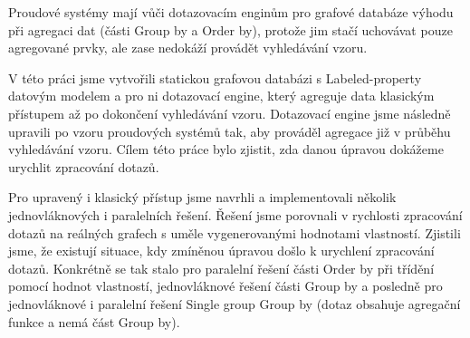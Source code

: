 \documentclass[12pt]{report}
\begin{document}
Proudové systémy mají vůči dotazovacím enginům pro grafové databáze výhodu při agregaci dat (části Group by a Order by), protože jim stačí uchovávat pouze agregované prvky, ale zase nedokáží provádět vyhledávání vzoru.

V této práci jsme vytvořili statickou grafovou databázi s Labeled-property datovým modelem a pro ni dotazovací engine, který agreguje data klasickým přístupem až po dokončení vyhledávání vzoru.
Dotazovací engine jsme následně upravili po vzoru proudových systémů tak, aby prováděl agregace již v průběhu vyhledávání vzoru.
Cílem této práce bylo zjistit, zda danou úpravou dokážeme urychlit zpracování dotazů.

Pro upravený i klasický přístup jsme navrhli a implementovali několik jednovláknových i paralelních řešení.
Řešení jsme porovnali v rychlosti zpracování dotazů na reálných grafech s uměle vygenerovanými hodnotami vlastností.
Zjistili jsme, že existují situace, kdy zmíněnou úpravou došlo k urychlení zpracování dotazů.
Konkrétně se tak stalo pro paralelní řešení části Order by při třídění pomocí hodnot vlastností, jednovláknové řešení části Group by a posledně pro jednovláknové i paralelní řešení Single group Group by (dotaz obsahuje agregační funkce a nemá část Group by).
\end{document}
